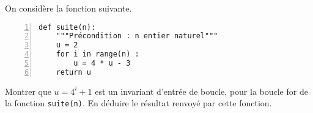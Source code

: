 On considère la fonction suivante.
\begin{Verbatim}[gobble=0,numbers=left]
def suite(n):
    """Précondition : n entier naturel"""
    u = 2
    for i in range(n) : 
        u = 4 * u - 3 
    return u
\end{Verbatim}

\bigskip{}

\question{} Montrer que \og $u = 4^i + 1$ \fg{} est un invariant d'entrée de boucle, pour la boucle for de la fonction \texttt{suite(n)}. En déduire le résultat renvoyé par cette fonction. 